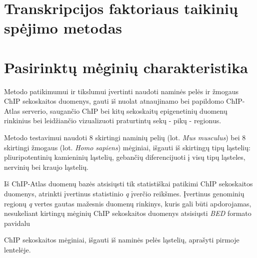 \documentclass[12pt]{article}
\begin{document}
\newpage

\section{Transkripcijos faktoriaus taikinių spėjimo metodas}

\newpage


\section{Pasirinktų mėginių charakteristika}
Metodo patikimumui ir tikslumui įvertinti naudoti naminės pelės ir žmogaus
ChIP sekoskaitos duomenys, gauti iš nuolat atnaujinamo bei papildomo
ChIP-Atlas\cite{CHIPATLAS} serverio, saugančio ChIP bei kitų sekoskaitų
epigenetinių duomenų rinkinius bei leidžiančio vizualizuoti praturtintų sekų -
pikų - regionus\cite{CHIPATLAS2}.

Metodo testavimui naudoti 8 skirtingi naminių pelių (lot. \emph{Mus musculus})
bei 8 skirtingi žmogaus (lot. \emph{Homo sapiens}) mėginiai, išgauti iš
skirtingų tipų ląstelių: pliuripotentinių kamieninių ląstelių, gebančių
diferencijuoti į visų tipų ląsteles, nervinių bei kraujo ląstelių.

Iš ChIP-Atlas duomenų bazės atsisiųsti tik statistiškai patikimi ChIP
sekoskaitos duomenys, atrinkti įvertinus statistinio \emph{q} įverčio reikšmes.
Įvertinus genominių regionų \emph{q} vertes gautas mažesnis duomenų rinkinys,
kuris gali būti apdorojamas, nesukeliant kirtingų mėginių ChIP sekoskaitos duomenys atsisiųsti \emph{BED} formato
pavidalu

ChIP sekoskaitos mėginiai, išgauti iš naminės pelės ląstelių, aprašyti pirmoje
lentelėje.
\end{document}
